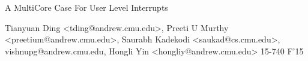 \documentclass[11pt]{article}
\begin{document}
\vspace*{-5ex}\centerline{\Large A MultiCore Case For User Level Interrupts}
\vspace*{-.5ex}
\begin{center}
Tianyuan Ding <tding@andrew.cmu.edu>,
Preeti U Murthy <preetium@andrew.cmu.edu>, Saurabh Kadekodi <saukad@cs.cmu.edu>, 
vishnupg@andrew.cmu.edu, Hongli Yin <hongliy@andrew.cmu.edu>
15-740 F'15
\end{center}











 

\end{document}
